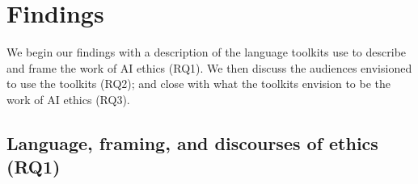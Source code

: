 \documentclass[acmsmall]{acmart}
\begin{document}
\section{Findings}

We begin our findings with a description of the language toolkits use to describe and frame the work of AI ethics (RQ1). We then discuss the audiences envisioned to use the toolkits (RQ2); and close with what the toolkits envision to be the work of AI ethics (RQ3). %


\subsection{Language, framing, and discourses of ethics (RQ1)}
\label{discourses}


\end{document}
